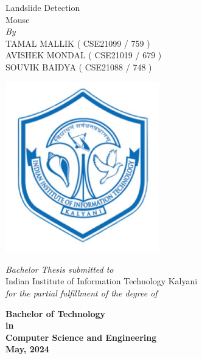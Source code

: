 

\clearpage
	\begin{titlepage}
    \centering
    {\Huge Landslide Detection \\ \vspace{0.4cm} Mouse\fontsize{24}{28.8}\selectfont {}\selectfont}\\
    
\vspace{\mySpace}
\vspace{0.1cm}
    \large \textit{By}\\
\vspace{\mySpace}
    {\Large TAMAL MALLIK ( CSE21099 / 759 ) \\
    \vspace{0.1cm}
    AVISHEK MONDAL ( CSE21019 / 679 ) \\
    \vspace{0.1cm}
    SOUVIK BAIDYA ( CSE21088  / 748 ) \\
    \fontsize{18}{22}\selectfont {}\selectfont
\vspace{\mySpace}}
    \begin{center}
        \includegraphics[width=0.5\textwidth]{iiitk_logo} %
    \end{center}
    {\Large \textit{Bachelor Thesis submitted to}\\
    \vspace{\mySpace}
    Indian Institute of Information Technology Kalyani \\ \vspace{\mySpace}
	 \textit{for the partial fulfillment of the degree of}\\ \vspace{\mySpace}

{\bfseries %
	 Bachelor of Technology \\
	 in \\
	 Computer Science and Engineering\\
\vspace{\mySpace}
	  May,  2024 \fontsize{18}{22}}\selectfont {}\selectfont}
    \vspace*{\fill}
\end{titlepage}